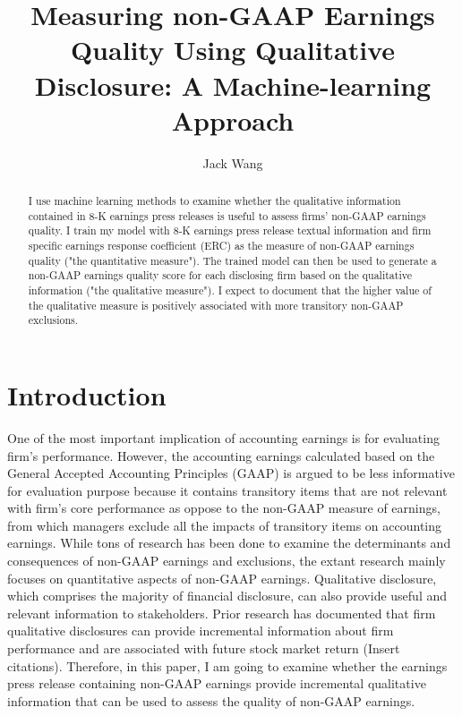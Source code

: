 \documentclass{article}
\title{Measuring non-GAAP Earnings Quality Using Qualitative Disclosure: A Machine-learning Approach}
\author{Jack Wang}
\begin{document}
\maketitle

\begin{abstract}
I use machine learning methods to examine whether the qualitative information contained in 8-K earnings press releases is useful to assess firms' non-GAAP earnings quality. I train my model with 8-K earnings press release textual information and firm specific earnings response coefficient (ERC) as the measure of non-GAAP earnings quality ("the quantitative measure"). The trained model can then be used to generate a non-GAAP earnings quality score for each disclosing firm based on the qualitative information ("the qualitative measure"). I expect to document that the higher value of the qualitative measure is positively associated with more transitory non-GAAP exclusions.

\end{abstract}

\section{Introduction}

One of the most important implication of accounting earnings is for evaluating firm's performance. However, the accounting earnings calculated based on the General Accepted Accounting Principles (GAAP) is argued to be less informative for evaluation purpose because it contains transitory items that are not relevant with firm's core performance as oppose to the non-GAAP measure of earnings, from which managers exclude all the impacts of transitory items on accounting earnings. While tons of research has been done to examine the determinants and consequences of non-GAAP earnings and exclusions, the extant research mainly focuses on quantitative aspects of non-GAAP earnings. Qualitative disclosure, which comprises the majority of financial disclosure, can also provide useful and relevant information to stakeholders. Prior research has documented that firm qualitative disclosures can provide incremental information about firm performance and are associated with future stock market return (Insert citations). Therefore, in this paper, I am going to examine whether the earnings press release containing non-GAAP earnings provide incremental qualitative information that can be used to assess the quality of non-GAAP earnings.
\end{document}
